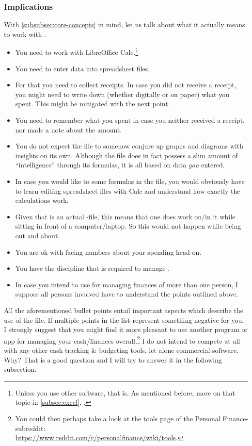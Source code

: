 \subsubsection{Implications}
\label{subsubsec:implications}

With \autoref{subsubsec:core-concepts} in mind, let us talk about what it actually means to work with \tfn.

\begin{itemize}
	\item You need to work with LibreOffice Calc.\footnote{Unless you use other software, that is.
	As mentioned before, more on that topic in \autoref{subsec:excel}, .}
	\item You need to enter data into spreadsheet files.
	\item For that you need to collect receipts.
	In case you did not receive a receipt, you might need to write down (whether digitally or on paper) what you spent.
	This might be mitigated with the next point.
	\item You need to remember what you spent in case you neither received a receipt, nor made a note about the amount.
	\item You do not expect the file to somehow conjure up graphs and diagrams with insights on its own.
	Although the file does in fact possess a slim amount of ``intelligence'' through its formulas, it is all based on data \emph{you} entered.
	\item In case you would like to some formulas in the file, you would obviously have to learn editing spreadsheet files with Calc and understand how exactly the calculations work.
	\item Given that \tfn is an actual -file, this means that one does work on/in it while sitting in front of a computer/laptop.
	So this would not happen while being out and about.
	\item You are ok with facing numbers about your spending head-on.
	\item You have the discipline that is required to manage \tfn.
	\item In case you intend to use \tfn for managing finances of more than one person, I suppose all persons involved have to understand the points outlined above.
\end{itemize}

All the aforementioned bullet points entail important aspects which describe the use of the file.
If multiple points in the list represent something negative for you, I strongly suggest that you might find it more pleasant to use another program or app for managing your cash/finances overall.\footnote{You could then perhaps take a look at the tools page of the Personal Finance-subreddit:\\
\href{https://www.reddit.com/r/personalfinance/wiki/tools}{https://www.reddit.com/r/personalfinance/wiki/tools}.}
I do not intend to compete at all with any other cash tracking \& budgeting tools, let alone commercial software.
Why?
That is a good question and I will try to answer it in the following subsection.

